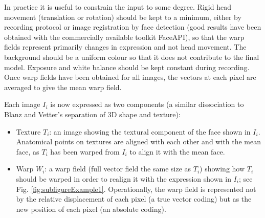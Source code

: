 \documentclass[runningheads]{llncs}
\begin{document}
In practice it is useful to constrain the input to some degree. Rigid head movement (translation or rotation) should be kept to a minimum, either by recording protocol or image registration by face detection (good results have been obtained with the commercially available toolkit FaceAPI\cite{website:fermentas-lambda}), so that the warp fields represent primarily changes in expression and not head movement. The background should be a uniform colour so that it does not contribute to the final model. Exposure and white balance should be kept constant during recording.
Once warp fields have been obtained for all images, the vectors at each pixel are averaged to give the mean warp field.



Each image $I_i$ is now expressed as two components (a similar dissociation to Blanz and Vetter's separation of 3D shape and texture\cite{blanz1999morphable}):
\begin{itemize}


\item Texture $T_i$: an image showing the textural component of the face shown in $I_i$. Anatomical points on textures are aligned with each other and with the mean face, as $T_i$ has been warped from $I_i$ to align it with the mean face.
\item Warp $W_i$: a warp field (full vector field the same size as $T_i$) showing how $T_i$ should be warped in order to realign it with the expression shown in $I_i$; see Fig. \ref{fig:subfigureExample1}.
Operationally, the warp field is represented not by the relative displacement of each pixel (a true vector coding) but as the new position of each pixel (an absolute coding).
\end{itemize}
\end{document}

